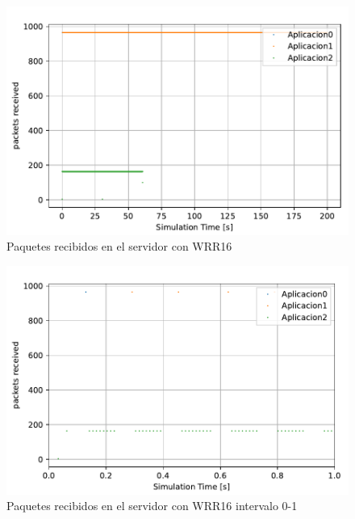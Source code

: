 \begin{figure}
    \centering
    \includegraphics{graficas/WRR/packetsReceived_WRR.pdf}
    \caption{Paquetes recibidos en el servidor con WRR16}
    \label{fig:sinqos_pktreceived99100}
\end{figure}

\begin{figure}
    \centering
    \includegraphics{graficas/WRR/packetsReceived_WRR_1.pdf}
    \caption{Paquetes recibidos en el servidor con WRR16 intervalo 0-1}
    \label{fig:sinqos_pktreceived99100}
\end{figure}

